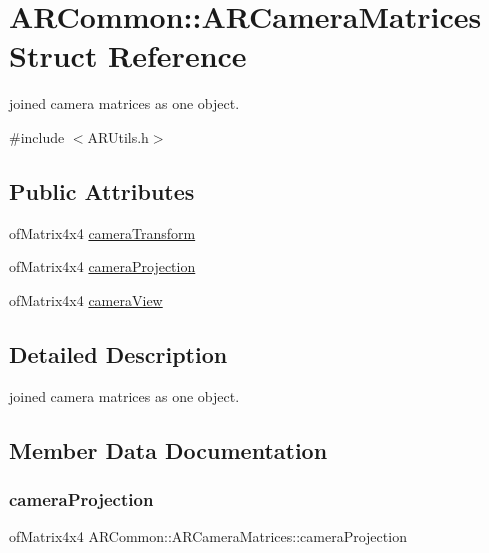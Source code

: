\hypertarget{struct_a_r_common_1_1_a_r_camera_matrices}{}\section{A\+R\+Common\+:\+:A\+R\+Camera\+Matrices Struct Reference}
\label{struct_a_r_common_1_1_a_r_camera_matrices}


joined camera matrices as one object.  




{\ttfamily \#include $<$A\+R\+Utils.\+h$>$}

\subsection*{Public Attributes}
\begin{DoxyCompactItemize}
\item 
of\+Matrix4x4 \mbox{\hyperlink{struct_a_r_common_1_1_a_r_camera_matrices_a704028e138238522f8e060d5d587b0ef}{camera\+Transform}}
\item 
of\+Matrix4x4 \mbox{\hyperlink{struct_a_r_common_1_1_a_r_camera_matrices_a5d0957360e888d95ae75358416dfe487}{camera\+Projection}}
\item 
of\+Matrix4x4 \mbox{\hyperlink{struct_a_r_common_1_1_a_r_camera_matrices_a0a6b9d23ece063831aac56c704d83d7f}{camera\+View}}
\end{DoxyCompactItemize}


\subsection{Detailed Description}
joined camera matrices as one object. 

\subsection{Member Data Documentation}
\mbox{\label{struct_a_r_common_1_1_a_r_camera_matrices_a5d0957360e888d95ae75358416dfe487}} 
\subsubsection{\texorpdfstring{camera\+Projection}{cameraProjection}}
{\footnotesize\ttfamily of\+Matrix4x4 A\+R\+Common\+::\+A\+R\+Camera\+Matrices\+::camera\+Projection}

